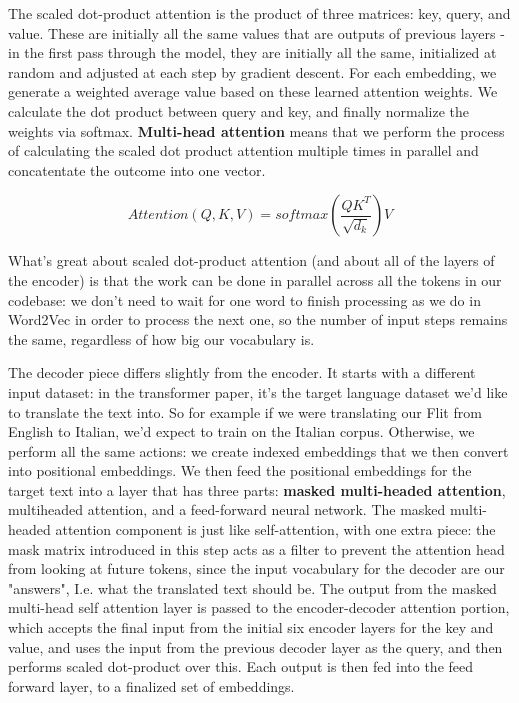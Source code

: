 \documentclass[11pt, table]{diazessay} %
\begin{document}
\begin{sloppypar}
The scaled dot-product attention is  the product of three matrices: key, query, and value. These are initially all the same values that are outputs of previous layers - in the first pass through the model, they are initially all the same, initialized at random and adjusted at each step by gradient descent. For each embedding, we generate a weighted average value based on these learned attention weights. We calculate the dot product between query and key, and finally normalize the weights via softmax. \textbf{Multi-head attention} means that we perform the process of calculating the scaled dot product attention multiple times in parallel and concatentate the outcome into one vector. 

\begin{equation}
Attention(Q, K, V) = softmax(\frac{QK^T}{\sqrt{d_k}})V
\end{equation}

What's great about scaled dot-product attention (and about all of the layers of the encoder) is that the work can be done in parallel across all the tokens in our codebase: we don't need to wait for one word to finish processing as we do in Word2Vec in order to process the next one, so the number of input steps remains the same, regardless of how big our vocabulary is. 

The decoder piece differs slightly from the encoder. It starts with a different input dataset: in the transformer paper, it's the target language dataset we'd like to translate the text into.  So for example if we were translating our Flit from English to Italian, we'd expect to train on the Italian corpus. Otherwise, we perform all the same actions: we create indexed embeddings that we then convert into positional embeddings. We then feed the positional embeddings for the target text into a layer that has three parts: \textbf{masked multi-headed attention}, multiheaded attention, and a feed-forward neural network. The masked multi-headed attention component is just like self-attention, with one extra piece: the mask matrix introduced in this step acts as a filter to prevent the attention head from looking at future tokens, since the input vocabulary for the decoder are our "answers", I.e. what the translated text should be. The output from the masked multi-head self attention layer is passed to the encoder-decoder attention portion, which accepts the final input from the initial six encoder layers for the key and value, and uses the input from the previous decoder layer as the query, and then performs scaled dot-product over this. Each output is then fed into the feed forward layer, to a finalized set of embeddings. 


\end{sloppypar}
\end{document}
